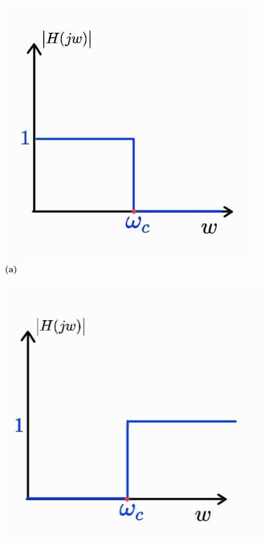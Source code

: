 \begin{figure}[h!]
    \centering
    \begin{minipage}[b]{0.32\linewidth}
        \includegraphics[width=\linewidth]{figuras/passa_baixa.png}
        \centering
        \\ \textbf{(a)}
    \end{minipage}
    \begin{minipage}[b]{0.32\linewidth}
        \includegraphics[width=\linewidth]{figuras/passa_altas.png}

\end{minipage}
\end{figure}
